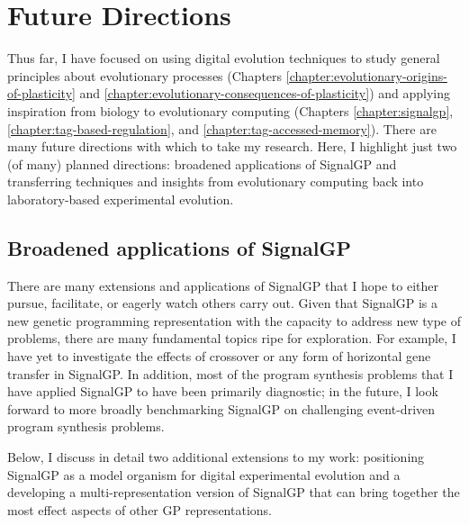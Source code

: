\section{Future Directions}

Thus far, I have focused on using digital evolution techniques to study general principles about evolutionary processes (Chapters \ref{chapter:evolutionary-origins-of-plasticity} and \ref{chapter:evolutionary-consequences-of-plasticity}) and applying inspiration from biology to evolutionary computing (Chapters \ref{chapter:signalgp}, \ref{chapter:tag-based-regulation}, and \ref{chapter:tag-accessed-memory}).
There are many future directions with which to take my research.
Here, I highlight just two (of many) planned directions: broadened applications of SignalGP and transferring techniques and insights from evolutionary computing back into laboratory-based experimental evolution.%


\subsection{Broadened applications of SignalGP}

There are many extensions and applications of SignalGP that I hope to either pursue, facilitate, or eagerly watch others carry out.
Given that SignalGP is a new genetic programming representation with the capacity to address new type of problems, there are many fundamental topics ripe for exploration.
For example, I have yet to investigate the effects of crossover or any form of horizontal gene transfer in SignalGP.
In addition, most of the program synthesis problems that I have applied SignalGP to have been primarily diagnostic; in the future, I look forward to more broadly benchmarking SignalGP on challenging event-driven program synthesis problems.  

Below, I discuss in detail two additional extensions to my work: positioning SignalGP as a model organism for digital experimental evolution and a developing a multi-representation version of SignalGP that can bring together the most effect aspects of other GP representations.

